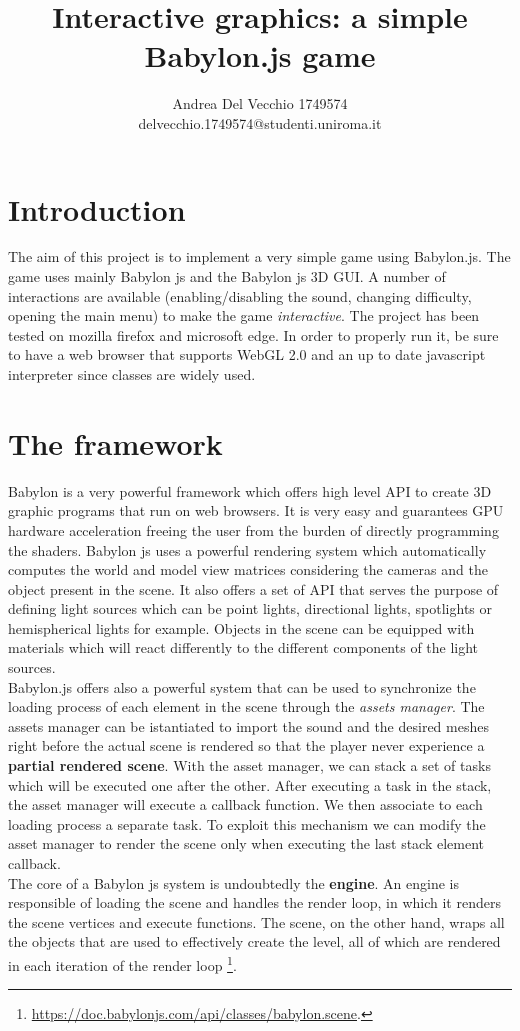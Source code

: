 \documentclass[14pt]{article}
\title{\textbf{Interactive graphics: a simple Babylon.js game}}
\author{Andrea Del Vecchio 1749574\\
		delvecchio.1749574@studenti.uniroma.it}
\date{}
\begin{document}
\maketitle
\section{Introduction}
The aim of this project is to implement a very simple game using Babylon.js. The game uses mainly Babylon js and the Babylon js 3D GUI. A number of interactions are available (enabling/disabling the sound, changing difficulty, opening the main menu) to make the game \textit{interactive}. The project has been tested on mozilla firefox and microsoft edge. In order to properly run it, be sure to have a web browser that supports WebGL 2.0 and an up to date javascript interpreter since classes are widely used.
\section{The framework}
Babylon is a very powerful framework which offers high level API to create 3D graphic programs that run on web browsers. It is very easy and guarantees GPU hardware acceleration freeing the user from the burden of directly programming the shaders. Babylon js uses a powerful rendering system which automatically computes the world and model view matrices considering the cameras and the object present in the scene. It also offers a set of API that serves the purpose of defining light sources which can be point lights, directional lights, spotlights or hemispherical lights for example. Objects in the scene can be equipped with materials which will react differently to the different components of the light sources. \\
Babylon.js offers also a powerful system that can be used to synchronize the loading process of each element in the scene through the \textit{assets manager}. The assets manager can be istantiated to import the sound and the desired meshes right before the actual scene is rendered so that the player never experience a \textbf{partial rendered scene}. With the asset manager, we can stack a set of tasks which will be executed one after the other. After executing a task in the stack, the asset manager will execute a callback function. We then associate to each loading process a separate task. To exploit this mechanism we can modify the asset manager to render the scene only when executing the last stack element callback.\\
The core of a Babylon js system is undoubtedly the \textbf{engine}. An engine is responsible of loading the scene and handles the render loop, in which it renders the scene vertices and execute functions. The scene, on the other hand, wraps all the objects that are used to effectively create the level, all of which are rendered in each iteration of the render loop \footnote{\url{https://doc.babylonjs.com/api/classes/babylon.scene}.}.\\
\end{document}
